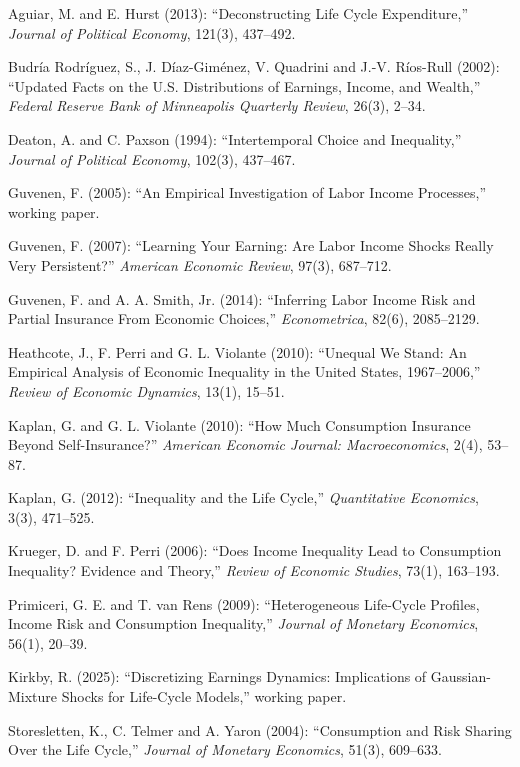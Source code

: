 \documentclass[11pt,fleqn]{article}
\begin{document}
\begin{thebibliography}{}

Aguiar, M. and E. Hurst (2013): ``Deconstructing Life Cycle Expenditure,''
\emph{Journal of Political Economy}, 121(3), 437--492.

Budr\'ia Rodr\'iguez, S., J. D\'iaz-Gim\'enez, V. Quadrini and J.-V. R\'ios-Rull
(2002): ``Updated Facts on the U.S. Distributions of Earnings, Income, and Wealth,''
\emph{Federal Reserve Bank of Minneapolis Quarterly Review}, 26(3), 2--34.

Deaton, A. and C. Paxson (1994): ``Intertemporal Choice and Inequality,''
\emph{Journal of Political Economy}, 102(3), 437--467.

Guvenen, F. (2005): ``An Empirical Investigation of Labor Income Processes,''
working paper.

Guvenen, F. (2007): ``Learning Your Earning: Are Labor Income Shocks Really Very
Persistent?'' \emph{American Economic Review}, 97(3), 687--712.

Guvenen, F. and A. A. Smith, Jr. (2014): ``Inferring Labor Income Risk and Partial
Insurance From Economic Choices,'' \emph{Econometrica}, 82(6), 2085--2129.

Heathcote, J., F. Perri and G. L. Violante (2010): ``Unequal We Stand: An Empirical
Analysis of Economic Inequality in the United States, 1967--2006,'' \emph{Review of
Economic Dynamics}, 13(1), 15--51.

Kaplan, G. and G. L. Violante (2010): ``How Much Consumption Insurance Beyond
Self-Insurance?'' \emph{American Economic Journal: Macroeconomics}, 2(4), 53--87.

Kaplan, G. (2012): ``Inequality and the Life Cycle,'' \emph{Quantitative Economics},
3(3), 471--525.

Krueger, D. and F. Perri (2006): ``Does Income Inequality Lead to Consumption Inequality?
Evidence and Theory,'' \emph{Review of Economic Studies}, 73(1), 163--193.

Primiceri, G. E. and T. van Rens (2009): ``Heterogeneous Life-Cycle Profiles, Income Risk
and Consumption Inequality,'' \emph{Journal of Monetary Economics}, 56(1), 20--39.

Kirkby, R. (2025): ``Discretizing Earnings Dynamics: Implications of
Gaussian-Mixture Shocks for Life-Cycle Models,'' working paper.

Storesletten, K., C. Telmer and A. Yaron (2004): ``Consumption and Risk Sharing Over
the Life Cycle,'' \emph{Journal of Monetary Economics}, 51(3), 609--633.

\end{thebibliography}
\end{document}
